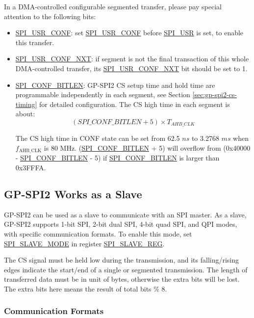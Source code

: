 \documentclass[main\_\_EN.tex]{subfiles}
\begin{document}
In a DMA-controlled configurable segmented transfer, please pay special attention to the following bits:
\begin{itemize}
    \item \hyperref[fielddesc:SPIUSRCONF]{SPI\_USR\_CONF}: set \hyperref[fielddesc:SPIUSRCONF]{SPI\_USR\_CONF} before \hyperref[fielddesc:SPIUSR]{SPI\_USR} is set, to enable this transfer.
    \item \hyperref[fielddesc:SPIUSRCONFNXT]{SPI\_USR\_CONF\_NXT}: if segment is not the final transaction of this whole DMA-controlled transfer, its \hyperref[fielddesc:SPIUSRCONFNXT]{SPI\_USR\_CONF\_NXT} bit should be set to 1.
    \item \hyperref[fielddesc:SPICONFBITLEN]{SPI\_CONF\_BITLEN}: GP-SPI2 CS setup time and hold time are programmable independently in each segment, see Section \ref{sec:gp-spi2-cs-timing} for detailed configuration. The CS high time in each segment is about:
    \[
    (\hyperref[fielddesc:SPICONFBITLEN]{SPI\_CONF\_BITLEN} + 5) \times T_{AHB\_CLK}
    \]

The CS high time in CONF state can be set from 62.5 $ns$ to 3.2768 $ms$ when $f_{\textrm{AHB\_CLK}}$ is 80 MHz.
(\hyperref[fielddesc:SPICONFBITLEN]{SPI\_CONF\_BITLEN} + 5) will overflow from (0x40000 - \hyperref[fielddesc:SPICONFBITLEN]{SPI\_CONF\_BITLEN} - 5) if \hyperref[fielddesc:SPICONFBITLEN]{SPI\_CONF\_BITLEN} is larger than 0x3FFFA. 
\end{itemize}

\subsection{GP-SPI2 Works as a Slave}\label{sec:gp-spi2-slave}

GP-SPI2 can be used as a slave to communicate with an SPI master. As a slave, GP-SPI2 supports 1-bit SPI, 2-bit dual SPI, 4-bit quad SPI, and QPI modes, with specific communication formats. To enable this mode, set \hyperref[fielddesc:SPISLAVEMODE]{SPI\_SLAVE\_MODE} in register \hyperref[regdesc:SPISLAVEREG]{SPI\_SLAVE\_REG}. 

The CS signal must be held low during the transmission, and its falling/rising edges indicate the start/end of a single or segmented transmission. The length of transferred data must be in unit of bytes, otherwise the extra bits will be lost. The extra bits here means the result of total bits \% 8.

\subsubsection{Communication Formats}\label{slave communication format}
\end{document}

